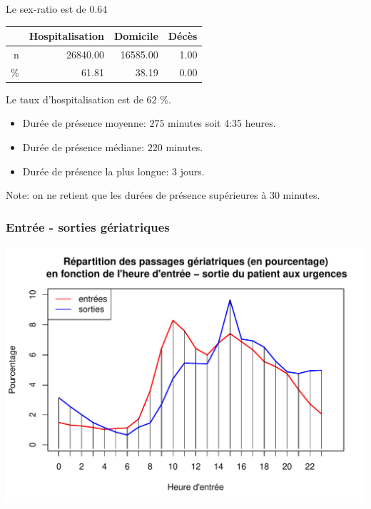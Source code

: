 \documentclass[12pt,english,french,twoside]{book}\usepackage[]{graphicx}\usepackage[]{color}
\makeatletter
\def\maxwidth{ %
  \ifdim\Gin@nat@width>\linewidth
    \linewidth
  \else
    \Gin@nat@width
  \fi
}
\newenvironment{knitrout}{}{} %
\makeatother
\begin{document}
Le sex-ratio est de $0.64$


\begin{table}[ht]
\centering
\begin{tabular}{rrrr}
  \hline
 & Hospitalisation & Domicile & Décès \\ 
  \hline
n & 26840.00 & 16585.00 & 1.00 \\ 
  \% & 61.81 & 38.19 & 0.00 \\ 
   \hline
\end{tabular}
\end{table}


Le taux d'hospitalisation est de $62$ \%.




\begin{itemize}
  \item Durée de présence moyenne: $275$ minutes soit 4:35 heures.
  \item Durée de présence médiane: $220$ minutes.
  \item Durée de présence la plus longue: $3$ jours.
\end{itemize}

Note: on ne retient que les durées de présence supérieures à 30 minutes.

\subsubsection*{Entrée - sorties gériatriques}

\begin{knitrout}
\color{fgcolor}
\includegraphics[width=\maxwidth]{figure/es_geriatriques-1} 

\end{knitrout}
\end{document}
